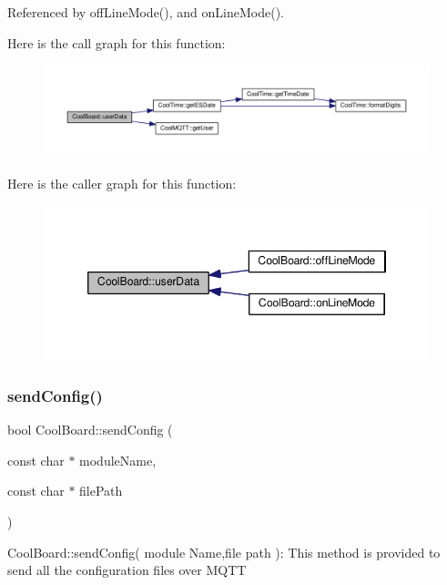 Referenced by off\+Line\+Mode(), and on\+Line\+Mode().

Here is the call graph for this function\+:\nopagebreak
\begin{figure}[H]
\begin{center}
\leavevmode
\includegraphics[width=350pt]{d7/df9/class_cool_board_ae7358fb6e623cfc81b775f5f1734909b_cgraph}
\end{center}
\end{figure}
Here is the caller graph for this function\+:\nopagebreak
\begin{figure}[H]
\begin{center}
\leavevmode
\includegraphics[width=346pt]{d7/df9/class_cool_board_ae7358fb6e623cfc81b775f5f1734909b_icgraph}
\end{center}
\end{figure}
\mbox{\label{class_cool_board_a705398b11560603fcdd1b9e8e95d0027}} 
\subsubsection{\texorpdfstring{send\+Config()}{sendConfig()}}
{\footnotesize\ttfamily bool Cool\+Board\+::send\+Config (\begin{DoxyParamCaption}\item[{const char $\ast$}]{module\+Name,  }\item[{const char $\ast$}]{file\+Path }\end{DoxyParamCaption})}

Cool\+Board\+::send\+Config( module Name,file path )\+: This method is provided to send all the configuration files over M\+Q\+TT

